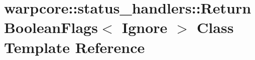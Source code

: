 \hypertarget{classwarpcore_1_1status__handlers_1_1ReturnBooleanFlags}{}\section{warpcore\+:\+:status\+\_\+handlers\+:\+:Return\+Boolean\+Flags$<$ Ignore $>$ Class Template Reference}
\label{classwarpcore_1_1status__handlers_1_1ReturnBooleanFlags}
